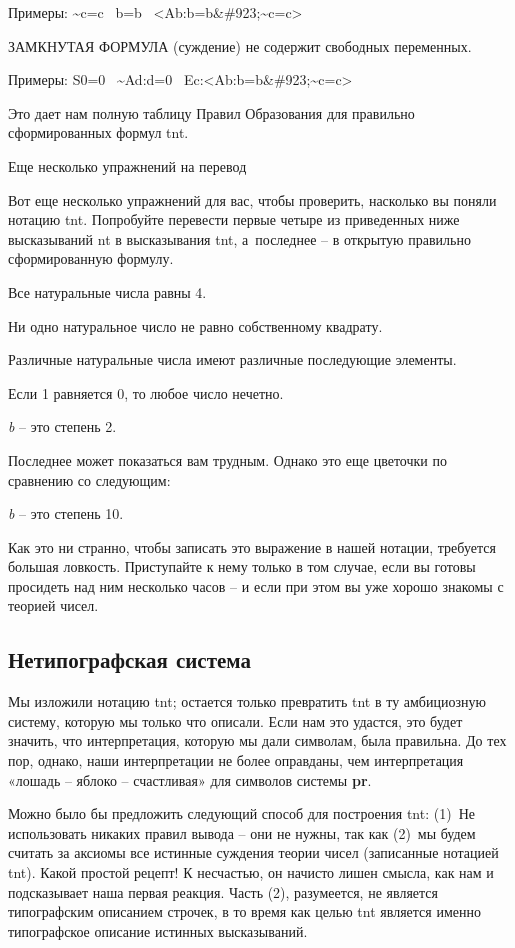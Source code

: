 \documentclass[../main.tex]{subfiles}
\begin{document}
Примеры: \textasciitilde c=c ~b=b~ \textless Ab:b=b\&\#923;\textasciitilde c=c\textgreater{}

ЗАМКНУТАЯ ФОРМУЛА (суждение) не содержит свободных переменных.

Примеры: S0=0~ \textasciitilde Ad:d=0~ Ec:\textless Ab:b=b\&\#923;\textasciitilde c=c\textgreater{}

Это дает нам полную таблицу Правил Образования для правильно сформированных формул \acs{tnt}.

Еще несколько упражнений на перевод

Вот еще несколько упражнений для вас, чтобы проверить, насколько вы поняли нотацию \acs{tnt}. Попробуйте перевести первые четыре из приведенных ниже высказываний \acs{nt} в высказывания \acs{tnt}, а~последнее \--- в открытую правильно сформированную формулу.

Все натуральные числа равны 4.

Ни одно натуральное число не равно собственному квадрату.

Различные натуральные числа имеют различные последующие элементы.

Если 1 равняется 0, то любое число нечетно.

\emph{b} \--- это степень 2.

Последнее может показаться вам трудным. Однако это еще цветочки по сравнению со следующим:

\emph{b} \--- это степень 10.

Как это ни странно, чтобы записать это выражение в нашей нотации, требуется большая ловкость. Приступайте к нему только в том случае, если вы готовы просидеть над ним несколько часов \--- и если при этом вы уже хорошо знакомы с теорией чисел.


\subsection{Нетипографская система}

Мы изложили нотацию \acs{tnt}; остается только превратить \acs{tnt} в ту амбициозную систему, которую мы только что описали. Если нам это удастся, это будет значить, что интерпретация, которую мы дали символам, была правильна. До тех пор, однако, наши интерпретации не более оправданы, чем интерпретация «лошадь \--- яблоко \--- счастливая» для символов системы \textbf{pr}.

Можно было бы предложить следующий способ для построения \acs{tnt}: (1)~Не использовать никаких правил вывода \--- они не нужны, так как (2)~мы будем считать за аксиомы все истинные суждения теории чисел (записанные нотацией \acs{tnt}). Какой простой рецепт! К несчастью, он начисто лишен смысла, как нам и подсказывает наша первая реакция. Часть (2), разумеется, не является типографским описанием строчек, в то время как целью \acs{tnt} является именно типографское описание истинных высказываний.
\end{document}
